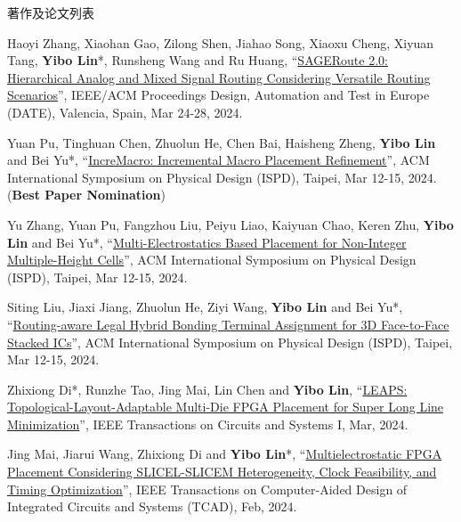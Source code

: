 \begin{rSection}{著作及论文列表}
\begin{description}[font=\normalfont, rightmargin=2em]
{}
            

\item[{[C141]}]{
        Haoyi Zhang, Xiaohan Gao, Zilong Shen, Jiahao Song, Xiaoxu Cheng, Xiyuan Tang, \textbf{Yibo Lin}*, Runsheng Wang and Ru Huang, 
    ``\href{https://ieeexplore.ieee.org/document/10546542}{SAGERoute 2.0: Hierarchical Analog and Mixed Signal Routing Considering Versatile Routing Scenarios}'', 
    IEEE/ACM Proceedings Design, Automation and Test in Europe (DATE), Valencia, Spain, Mar 24-28, 2024.
    
}
            

\item[{[C140]}]{
        Yuan Pu, Tinghuan Chen, Zhuolun He, Chen Bai, Haisheng Zheng, \textbf{Yibo Lin} and Bei Yu*, 
    ``\href{https://doi.org/10.1145/3626184.3633321}{IncreMacro: Incremental Macro Placement Refinement}'', 
    ACM International Symposium on Physical Design (ISPD), Taipei, Mar 12-15, 2024.
    (\textbf{Best Paper Nomination})
}
            

\item[{[C139]}]{
        Yu Zhang, Yuan Pu, Fangzhou Liu, Peiyu Liao, Kaiyuan Chao, Keren Zhu, \textbf{Yibo Lin} and Bei Yu*, 
    ``\href{https://doi.org/10.1145/3626184.3633320}{Multi-Electrostatics Based Placement for Non-Integer Multiple-Height Cells}'', 
    ACM International Symposium on Physical Design (ISPD), Taipei, Mar 12-15, 2024.
    
}
            

\item[{[C138]}]{
        Siting Liu, Jiaxi Jiang, Zhuolun He, Ziyi Wang, \textbf{Yibo Lin} and Bei Yu*, 
    ``\href{https://doi.org/10.1145/3626184.3633322}{Routing-aware Legal Hybrid Bonding Terminal Assignment for 3D Face-to-Face Stacked ICs}'', 
    ACM International Symposium on Physical Design (ISPD), Taipei, Mar 12-15, 2024.
    
}
            

\item[{[J137]}]{
        Zhixiong Di*, Runzhe Tao, Jing Mai, Lin Chen and \textbf{Yibo Lin}, 
    ``\href{https://doi.org/10.1109/TCSI.2023.3340554}{LEAPS: Topological-Layout-Adaptable Multi-Die FPGA Placement for Super Long Line Minimization}'', 
    IEEE Transactions on Circuits and Systems I, Mar, 2024.
    
}
            

\item[{[J136]}]{
        Jing Mai, Jiarui Wang, Zhixiong Di and \textbf{Yibo Lin}*, 
    ``\href{https://doi.org/10.1109/TCAD.2023.3313101}{Multielectrostatic FPGA Placement Considering SLICEL-SLICEM Heterogeneity, Clock Feasibility, and Timing Optimization}'', 
    IEEE Transactions on Computer-Aided Design of Integrated Circuits and Systems (TCAD), Feb, 2024.
    
}
\end{description}
\end{rSection}
